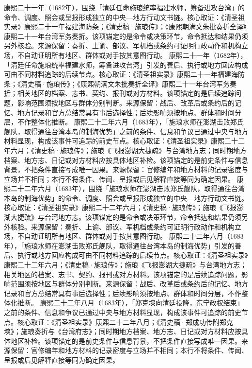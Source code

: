 康熙二十一年（1682年），围绕「清廷任命施琅统率福建水师，筹备进攻台湾」的命令、调度、照会或呈报形成独立的中央—地方行动文书链。核心取证：《清圣祖实录》康熙二十一年福建海防条；《清史稿·施琅传》；《康熙朝满文朱批奏折全译》康熙二十一年台湾军务奏折。该项锚定的是命令或决策环节，命令抵达和结果仍须另外核验。来源保留：奏折、上谕、部议、军机档或条约可证明行政动作和机构立场，不自动证明所有地区、群体或对手按其意图行动。
康熙二十一年（1682年），「清廷任命施琅统率福建水师，筹备进攻台湾」引发的善后、执行或地方回应构成可由不同材料追踪的后续节点。核心取证：《清圣祖实录》康熙二十一年福建海防条；《清史稿·施琅传》；《康熙朝满文朱批奏折全译》康熙二十一年台湾军务奏折；相关地区的档案、志书、契约、报刊或对方材料。该项锚定的是后续追踪问题，影响范围须按地区与群体分别判断。来源保留：战后、改革后或条约后的记忆、地方记录和官方总结常具有事后选择性；后续影响须按地点、群体和时间分层，不作整体化推断。
康熙二十二年六月（1683年），「施琅水师在澎湖击败郑氏舰队，取得通往台湾本岛的制海优势」之前的条件、信息和争议已通过中央与地方材料显现，构成该事件可追踪的前史节点。核心取证：《清圣祖实录》康熙二十二年六月；《清史稿·施琅传》；施琅《飞报澎湖大捷疏》与台湾地方志；同时期地方档案、地方志、日记或对方材料应按具体地区补检。该项锚定的是前史条件与信息背景，不把条件直接写成唯一因果。来源保留：官修编年和地方材料的记录密度与立场并不相同；本行不将条件、传闻、呈报或后见解释直接等同为确定因果。
康熙二十二年六月（1683年），围绕「施琅水师在澎湖击败郑氏舰队，取得通往台湾本岛的制海优势」的命令、调度、照会或呈报形成独立的中央—地方行动文书链。核心取证：《清圣祖实录》康熙二十二年六月；《清史稿·施琅传》；施琅《飞报澎湖大捷疏》与台湾地方志。该项锚定的是命令或决策环节，命令抵达和结果仍须另外核验。来源保留：奏折、上谕、部议、军机档或条约可证明行政动作和机构立场，不自动证明所有地区、群体或对手按其意图行动。
康熙二十二年六月（1683年），「施琅水师在澎湖击败郑氏舰队，取得通往台湾本岛的制海优势」引发的善后、执行或地方回应构成可由不同材料追踪的后续节点。核心取证：《清圣祖实录》康熙二十二年六月；《清史稿·施琅传》；施琅《飞报澎湖大捷疏》与台湾地方志；相关地区的档案、志书、契约、报刊或对方材料。该项锚定的是后续追踪问题，影响范围须按地区与群体分别判断。来源保留：战后、改革后或条约后的记忆、地方记录和官方总结常具有事后选择性；后续影响须按地点、群体和时间分层，不作整体化推断。
康熙二十二年八月（1683年），「郑克塽向清廷投降，东宁政权结束」之前的条件、信息和争议已通过中央与地方材料显现，构成该事件可追踪的前史节点。核心取证：《清圣祖实录》康熙二十二年八月；《清史稿·郑成功传附郑克塽》；施琅奏折与《台湾府志》；同时期地方档案、地方志、日记或对方材料应按具体地区补检。该项锚定的是前史条件与信息背景，不把条件直接写成唯一因果。来源保留：官修编年和地方材料的记录密度与立场并不相同；本行不将条件、传闻、呈报或后见解释直接等同为确定因果。
